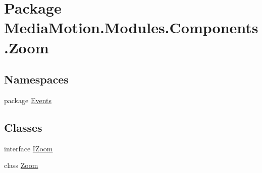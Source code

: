 \hypertarget{namespace_media_motion_1_1_modules_1_1_components_1_1_zoom}{\section{Package Media\+Motion.\+Modules.\+Components.\+Zoom}
\label{namespace_media_motion_1_1_modules_1_1_components_1_1_zoom}
}
\subsection*{Namespaces}
\begin{DoxyCompactItemize}
\item 
package \hyperlink{namespace_media_motion_1_1_modules_1_1_components_1_1_zoom_1_1_events}{Events}
\end{DoxyCompactItemize}
\subsection*{Classes}
\begin{DoxyCompactItemize}
\item 
interface \hyperlink{interface_media_motion_1_1_modules_1_1_components_1_1_zoom_1_1_i_zoom}{I\+Zoom}
\item 
class \hyperlink{class_media_motion_1_1_modules_1_1_components_1_1_zoom_1_1_zoom}{Zoom}
\end{DoxyCompactItemize}
